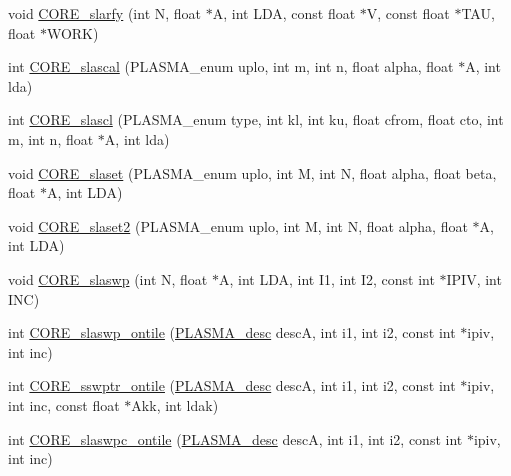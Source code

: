 \begin{DoxyCompactItemize}
\item 
void \hyperlink{group__CORE__float_ga1fdc98ca9c95ef03e67ebfd9caa5fac2_ga1fdc98ca9c95ef03e67ebfd9caa5fac2}{C\+O\+R\+E\+\_\+slarfy} (int N, float $\ast$A, int L\+D\+A, const float $\ast$V, const float $\ast$T\+A\+U, float $\ast$W\+O\+R\+K)
\item 
int \hyperlink{group__CORE__float_ga7bd8e8e447f92627912f94bee0d3466b_ga7bd8e8e447f92627912f94bee0d3466b}{C\+O\+R\+E\+\_\+slascal} (P\+L\+A\+S\+M\+A\+\_\+enum uplo, int m, int n, float alpha, float $\ast$A, int lda)
\item 
int \hyperlink{group__CORE__float_ga9440f77e19f04704384bcafe8230da9c_ga9440f77e19f04704384bcafe8230da9c}{C\+O\+R\+E\+\_\+slascl} (P\+L\+A\+S\+M\+A\+\_\+enum type, int kl, int ku, float cfrom, float cto, int m, int n, float $\ast$A, int lda)
\item 
void \hyperlink{group__CORE__float_ga4688c5ff91f858f045842084b3a5a60b_ga4688c5ff91f858f045842084b3a5a60b}{C\+O\+R\+E\+\_\+slaset} (P\+L\+A\+S\+M\+A\+\_\+enum uplo, int M, int N, float alpha, float beta, float $\ast$A, int L\+D\+A)
\item 
void \hyperlink{group__CORE__float_ga8782b68c87c36eac95f353f0bd98751c_ga8782b68c87c36eac95f353f0bd98751c}{C\+O\+R\+E\+\_\+slaset2} (P\+L\+A\+S\+M\+A\+\_\+enum uplo, int M, int N, float alpha, float $\ast$A, int L\+D\+A)
\item 
void \hyperlink{group__CORE__float_gae81d76da22fcf7fc3c9caf2c5bec6e8e_gae81d76da22fcf7fc3c9caf2c5bec6e8e}{C\+O\+R\+E\+\_\+slaswp} (int N, float $\ast$A, int L\+D\+A, int I1, int I2, const int $\ast$I\+P\+I\+V, int I\+N\+C)
\item 
int \hyperlink{group__CORE__float_ga885300e3d48ddcabf2df944c3fded477_ga885300e3d48ddcabf2df944c3fded477}{C\+O\+R\+E\+\_\+slaswp\+\_\+ontile} (\hyperlink{structplasma__desc__t}{P\+L\+A\+S\+M\+A\+\_\+desc} desc\+A, int i1, int i2, const int $\ast$ipiv, int inc)
\item 
int \hyperlink{group__CORE__float_gab22c6497e9635b9382c02f6e15e8f34d_gab22c6497e9635b9382c02f6e15e8f34d}{C\+O\+R\+E\+\_\+sswptr\+\_\+ontile} (\hyperlink{structplasma__desc__t}{P\+L\+A\+S\+M\+A\+\_\+desc} desc\+A, int i1, int i2, const int $\ast$ipiv, int inc, const float $\ast$Akk, int ldak)
\item 
int \hyperlink{group__CORE__float_ga8dc96646f76f41d7e1f3ccf3786a2852_ga8dc96646f76f41d7e1f3ccf3786a2852}{C\+O\+R\+E\+\_\+slaswpc\+\_\+ontile} (\hyperlink{structplasma__desc__t}{P\+L\+A\+S\+M\+A\+\_\+desc} desc\+A, int i1, int i2, const int $\ast$ipiv, int inc)

\end{DoxyCompactItemize}
